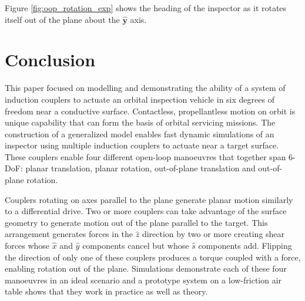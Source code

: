 \documentclass[letterpaper, 10 pt, conference]{ieeeconf}  %
\begin{document}
   \par Figure \ref{fig:oop_rotation_exp} shows the heading of the inspector as it rotates itself out of the plane about the $\hat{\textbf{y}}$ axis.



\section{Conclusion}
\label{sec:conclusion}
This paper focused on modelling and demonstrating the ability of a system of induction couplers to actuate an orbital inspection vehicle in six degrees of freedom near a conductive surface. Contactless, propellantless motion on orbit is unique capability that can form the basis of orbital servicing missions. The construction of a generalized model enables fast dynamic simulations of an inspector using multiple induction couplers to actuate near a target surface. These couplers enable four different open-loop manoeuvres that together span 6-DoF: planar translation, planar rotation, out-of-plane translation and out-of-plane rotation.

\par Couplers rotating on axes parallel to the plane generate planar motion similarly to a differential drive. Two or more couplers can take advantage of the surface geometry to generate motion out of the plane parallel to the target. This arrangement generates forces in the $\hat{z}$ direction by two or more creating shear forces whose $\hat{x}$ and $\hat{y}$ components cancel but whose $\hat{s}$ components add. Flipping the direction of only one of these couplers produces a torque coupled with a force, enabling rotation out of the plane. Simulations demonstrate each of these four manoeuvres in an ideal scenario and a prototype system on a low-friction air table shows that they work in practice as well as theory.
 
\end{document}
